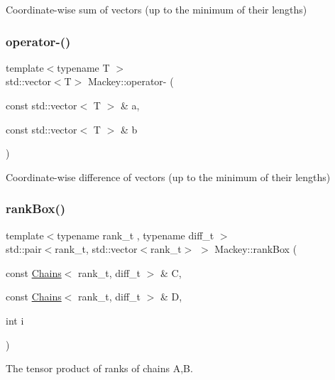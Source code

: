Coordinate-\/wise sum of vectors (up to the minimum of their lengths) 

\mbox{\label{namespaceMackey_ae86e49097ef9a09ebcd0173881e88786}} 
\subsubsection{\texorpdfstring{operator-\/()}{operator-()}}
{\footnotesize\ttfamily template$<$typename T $>$ \\
std\+::vector$<$T$>$ Mackey\+::operator-\/ (\begin{DoxyParamCaption}\item[{const std\+::vector$<$ T $>$ \&}]{a,  }\item[{const std\+::vector$<$ T $>$ \&}]{b }\end{DoxyParamCaption})}



Coordinate-\/wise difference of vectors (up to the minimum of their lengths) 

\mbox{\label{namespaceMackey_a1257ce64369e72438023fd4e261c7c83}} 
\subsubsection{\texorpdfstring{rank\+Box()}{rankBox()}}
{\footnotesize\ttfamily template$<$typename rank\+\_\+t , typename diff\+\_\+t $>$ \\
std\+::pair$<$rank\+\_\+t, std\+::vector$<$rank\+\_\+t$>$ $>$ Mackey\+::rank\+Box (\begin{DoxyParamCaption}\item[{const \hyperlink{classMackey_1_1Chains}{Chains}$<$ rank\+\_\+t, diff\+\_\+t $>$ \&}]{C,  }\item[{const \hyperlink{classMackey_1_1Chains}{Chains}$<$ rank\+\_\+t, diff\+\_\+t $>$ \&}]{D,  }\item[{int}]{i }\end{DoxyParamCaption})}



The tensor product of ranks of chains A,B. 

